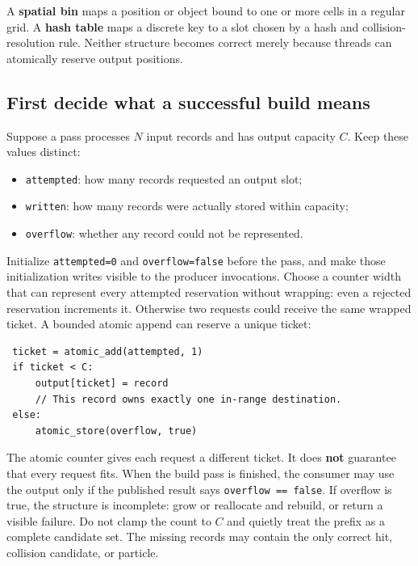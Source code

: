A \textbf{spatial bin} maps a position or object bound to one or more cells in a regular grid. A \textbf{hash table} maps a discrete key to a slot chosen by a hash and collision-resolution rule. Neither structure becomes correct merely because threads can atomically reserve output positions.

\subsection{First decide what a successful build means}\label{03-visual-computing-i-ch016-first-decide-what-a-successful-build-means}

\hypertarget{03-visual-computing-i-ch016-first-decide-what-a-successful-build-means}{}

Suppose a pass processes \(N\) input records and has output capacity \(C\). Keep these values distinct:

\begin{itemize}
\tightlist
\item
  \texttt{attempted}: how many records requested an output slot;
\item
  \texttt{written}: how many records were actually stored within capacity;
\item
  \texttt{overflow}: whether any record could not be represented.
\end{itemize}

Initialize \texttt{attempted=0} and \texttt{overflow=false} before the pass, and make those initialization writes visible to the producer invocations. Choose a counter width that can represent every attempted reservation without wrapping: even a rejected reservation increments it. Otherwise two requests could receive the same wrapped ticket. A bounded atomic append can reserve a unique ticket:

\begin{verbatim}
 ticket = atomic_add(attempted, 1)
 if ticket < C:
     output[ticket] = record
     // This record owns exactly one in-range destination.
 else:
     atomic_store(overflow, true)
\end{verbatim}

The atomic counter gives each request a different ticket. It does \textbf{not} guarantee that every request fits. When the build pass is finished, the consumer may use the output only if the published result says \texttt{overflow\ ==\ false}. If overflow is true, the structure is incomplete: grow or reallocate and rebuild, or return a visible failure. Do not clamp the count to \(C\) and quietly treat the prefix as a complete candidate set. The missing records may contain the only correct hit, collision candidate, or particle.


